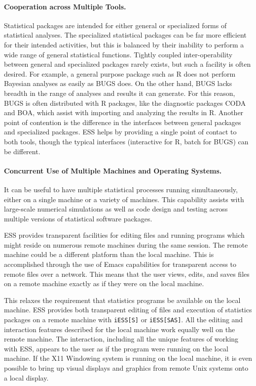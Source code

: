 \documentclass{article}
\newcommand{\stexttt}[1]{{\small\texttt{#1}}}
\begin{document}
\paragraph{Cooperation across Multiple Tools.}
Statistical packages are intended for either general or specialized
forms of statistical analyses.  The specialized statistical packages
can be far more efficient for their intended activities, but this is
balanced by their inability to perform a wide range of general
statistical functions.  Tightly coupled inter-operability between
general and specialized packages rarely exists, but such a facility is
often desired.  For example, a general purpose package such as R does
not perform Bayesian analyses as easily as BUGS does.  On the other
hand, BUGS lacks breadth in the range of analyses and results it can
generate.  For this reason, BUGS is often distributed with R packages,
like the diagnostic packages CODA and BOA, which assist with importing
and analyzing the results in R.  Another point of contention is the
difference in the interfaces between general packages and specialized
packages.  ESS helps by providing a single point of contact to both
tools, though the typical interfaces (interactive for R, batch for
BUGS) can be different.

\paragraph{Concurrent Use of Multiple Machines and Operating Systems.}
It can be useful to have multiple statistical processes running
simultaneously, either on a single machine or a variety of machines.
This capability assists with large-scale numerical simulations as well
as code design and testing across multiple versions of statistical
software packages.

ESS provides transparent facilities for editing files and running
programs which might reside on numerous remote machines during the
same session.  The remote machine could be a different platform than
the local machine.  This is accomplished through the use of Emacs
capabilities for transparent access to remote files over a network.
This means that the user views, edits, and saves files on a remote
machine exactly as if they were on the local machine.

This relaxes the requirement that statistics programs be available on
the local machine.  ESS provides both transparent editing of files and
execution of statistics packages on a remote machine with
\stexttt{iESS[S]} or \stexttt{iESS[SAS]}.  All the editing and
interaction features described for the local machine work equally well
on the remote machine.  The interaction, including all the unique
features of working with ESS, appears to the user as if the program
were running on the local machine.  If the X11 Windowing system is
running on the local machine, it is even possible to bring up visual
displays and graphics from remote Unix systems onto a local display.
\end{document}
